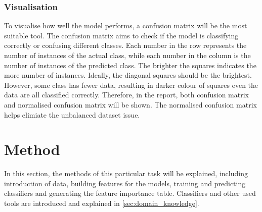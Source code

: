 \documentclass[10pt, a4paper, twocolumn]{article} %
\begin{document}
\subsubsection{Visualisation}
To visualise how well the model performs, a confusion matrix will be the most suitable tool. The confusion matrix aims 
to check if the model is classifying correctly or confusing different classes. Each number in the row represents the 
number of instances of the actual class, while each number in the column is the number of instances of the predicted 
class. The brighter the squares indicates the more number of instances. Ideally, the diagonal squares should be the 
brightest. However, some class has fewer data, resulting in darker colour of squares even the data are all classified 
correctly. Therefore, in the report, both confusion matrix and normalised confusion matrix will be shown. The normalised 
confusion matrix helps elimiate the unbalanced dataset issue. 
\section{Method}
In this section, the methods of this particular task will be explained, including introduction of data, building 
features for the models, training and predicting classifiers and generating the feature importance table. 
Classifiers and other used tools are introduced and explained in \autoref{sec:domain_knowledge}.
\end{document}
